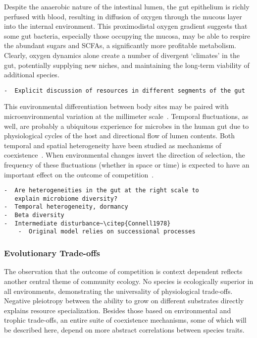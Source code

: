 \documentclass[12pt]{article}
\begin{document}
Despite the anaerobic nature of the intestinal lumen,
the gut epithelium is richly perfused with blood, resulting
in diffusion of oxygen through the mucous layer into
the internal environment.
This proximodistal oxygen gradient suggests that some
gut bacteria, especially those occupying the mucosa,
may be able to respire the abundant sugars and SCFAs,
a significantly more profitable metabolism.
Clearly, oxygen dynamics alone create a number of
divergent `climates' in the gut,
potentially supplying new niches,
and maintaining the long-term viability of additional
species.

\begin{verbatim}
-  Explicit discussion of resources in different segments of the gut
\end{verbatim}

This environmental differentiation between body sites may be
paired with microenvironmental variation at the millimeter
scale~\citep{TODO}.
Temporal fluctuations, as well, are probably a ubiquitous
experience for microbes in the human gut due to physiological
cycles of the host and directional flow of lumen contents.
Both temporal and spatial heterogeneity have been studied as
mechanisms of coexistence~\citep{Chesson2000}.
When environmental changes invert the direction of selection,
the frequency of these fluctuations (whether in space or time)
is expected to have an important effect on the outcome of
competition~\citep{Hutchinson1961}.

\begin{verbatim}
-  Are heterogeneities in the gut at the right scale to
   explain microbiome diversity?
-  Temporal heterogeneity, dormancy
-  Beta diversity
-  Intermediate disturbance~\citep{Connell1978}
    -  Original model relies on successional processes
\end{verbatim}


\subsubsection{Evolutionary Trade-offs}
The observation that the outcome of competition is context
dependent reflects another central theme of community ecology.
No species is ecologically superior in all environments,
demonstrating the universality of physiological trade-offs.
Negative pleiotropy between the ability to grow on
different substrates directly explains resource specialization.
Besides those based on environmental and trophic trade-offs,
an entire suite of coexistence mechanisms,
some of which will be described here,
depend on more abstract correlations between species traits.
\end{document}

